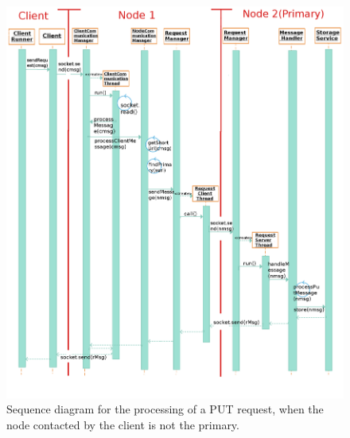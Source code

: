\documentclass{article}
\begin{document}
\begin{figure}
\centering
\includegraphics[scale=0.32]{sequence_diagram_complete}
\caption{Sequence diagram for the processing of a PUT request, when the node contacted by the client is not the primary.}
\label{fig:sequence_diagram_complete}
\end{figure}
\end{document}
